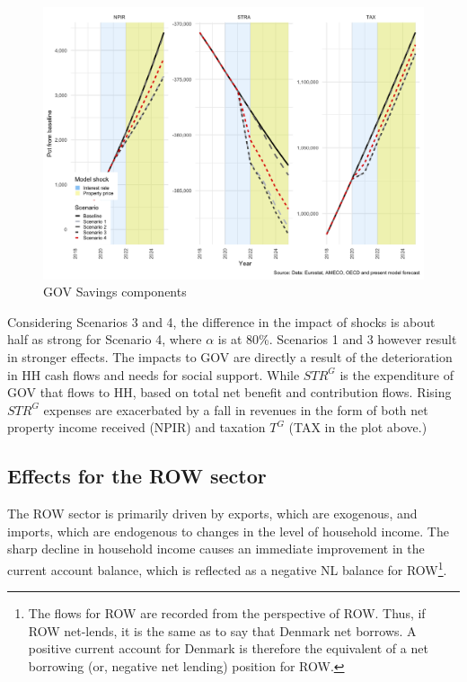 \documentclass[
]{book}
\begin{document}
\begin{figure}[H]
\includegraphics[width=0.95\linewidth]{figures/fl-fi-sfc-plot-GOV-indicators-savings-1} \caption{GOV Savings components}\label{fig:fl-fi-sfc-plot-GOV-indicators-savings}
\end{figure}

Considering Scenarios 3 and 4, the difference in the impact of shocks is about half as strong for Scenario 4, where \(\alpha\) is at 80\%. Scenarios 1 and 3 however result in stronger effects. The impacts to GOV are directly a result of the deterioration in HH cash flows and needs for social support. While \(STR^G\) is the expenditure of GOV that flows to HH, based on total net benefit and contribution flows. Rising \(STR^G\) expenses are exacerbated by a fall in revenues in the form of both net property income received (NPIR) and taxation \(T^G\) (TAX in the plot above.)

\hypertarget{effects-for-the-row-sector}{%
\subsection{Effects for the ROW sector}\label{effects-for-the-row-sector}}

The ROW sector is primarily driven by exports, which are exogenous, and imports, which are endogenous to changes in the level of household income. The sharp decline in household income causes an immediate improvement in the current account balance, which is reflected as a negative NL balance for ROW\footnote{The flows for ROW are recorded from the perspective of ROW. Thus, if ROW net-lends, it is the same as to say that Denmark net borrows. A positive current account for Denmark is therefore the equivalent of a net borrowing (or, negative net lending) position for ROW.}.
\end{document}

